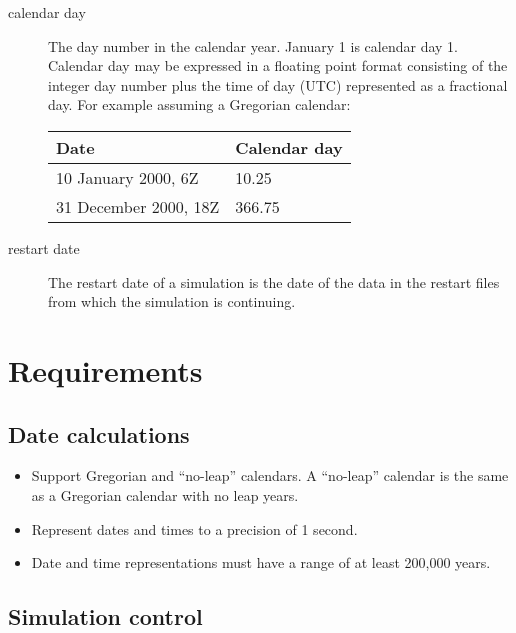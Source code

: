 \documentclass[12pt]{article}
\begin{document}
\begin{description}
\item [calendar day] \label{term:calendar-day}
The day number in the calendar year.  January 1 is calendar day 1.
Calendar day may be expressed in a floating point format consisting of the
integer day number plus the time of day (UTC) represented as a fractional
day.  For example assuming a Gregorian calendar:

\begin{tabular}{ll}
Date & Calendar day \\
\hline
10 January 2000, 6Z    &  10.25   \\
31 December 2000, 18Z  &  366.75
\end{tabular}

\item [restart date] \label{term:restart-date}
The restart date of a simulation is the date of the data in the restart
files from which the simulation is continuing.

\end{description}

\section{Requirements}

\subsection{Date calculations}

\begin{itemize}

\item
Support Gregorian and ``no-leap'' calendars.  A ``no-leap'' calendar is the
same as a Gregorian calendar with no leap years.

\item
Represent dates and times to a precision of 1 second.

\item
Date and time representations must have a range of at least 200,000 years.

\end{itemize}

\subsection{Simulation control}
\end{document}
